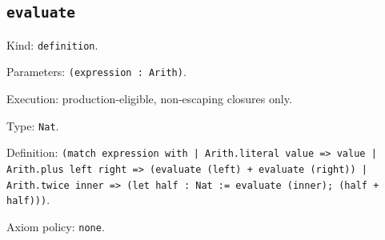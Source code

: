 \documentclass[11pt]{article}
\begin{document}
\subsection*{\texttt{evaluate}}
\noindent Kind: \texttt{definition}.\par
\noindent Parameters: \texttt{(expression : Arith)}.\par
\noindent Execution: production-eligible, non-escaping closures only.\par
\noindent Type: \texttt{Nat}.\par
\noindent Definition: \texttt{(match expression with | Arith.literal value => value | Arith.plus left right => (evaluate (left) + evaluate (right)) | Arith.twice inner => (let half : Nat := evaluate (inner); (half + half)))}.\par
\noindent Axiom policy: \texttt{none}.\par
\end{document}
